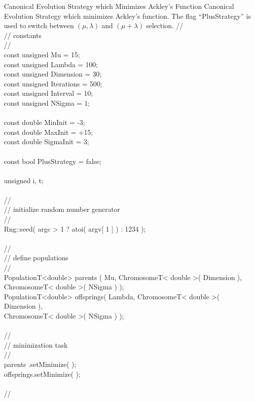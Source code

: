 \begin{programlisting}{Canonical Evolution Strategy which Minimizes Ackley's Function}{
    Canonical Evolution Strategy which minimizes Ackley's function.
    The flag ``PlusStrategy'' is used to switch between $(\mu,\lambda)$
    and $(\mu+\lambda)$ selection.}
    //\\
    // constants\\
    //\\
    const unsigned Mu           = 15;\\
    const unsigned Lambda       = 100;\\
    const unsigned Dimension    = 30;\\
    const unsigned Iterations   = 500;\\
    const unsigned Interval     = 10;\\
    const unsigned NSigma       = 1;\\
\\
    const double   MinInit      = -3;\\
    const double   MaxInit      = +15;\\
    const double   SigmaInit    = 3;\\
\\
    const bool     PlusStrategy = false;\\
\\
    unsigned       i, t;\\
\\
    //\\
    // initialize random number generator\\
    //\\
    Rng::seed( argc > 1 ? atoi( argv[ 1 ] ) : 1234 );\\
\\
    //\\
    // define populations\\
    //\\
    PopulationT<double> parents   ( Mu,     ChromosomeT< double >( Dimension ),\\
                                            ChromosomeT< double >( NSigma    ) );\\
    PopulationT<double> offsprings( Lambda, ChromosomeT< double >( Dimension ),\\
                                            ChromosomeT< double >( NSigma    ) );\\
\\
    //\\
    // minimization task\\
    //\\
    parents   .setMinimize( );\\
    offsprings.setMinimize( );\\
\\
    //\\

\end{programlisting}
